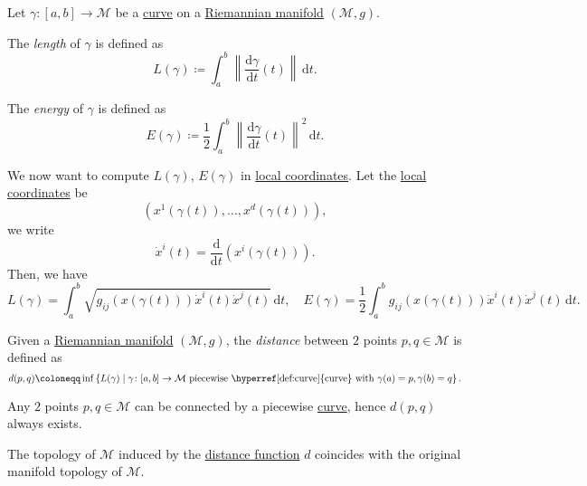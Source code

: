 \begin{definition*}
	Let \(\gamma \colon [a, b] \to  \mathcal{M} \) be a \hyperref[def:curve]{curve} on a \hyperref[def:Riemannian-manifold]{Riemannian manifold} \((\mathcal{M} , g)\).

	\begin{definition}[Length]\label{def:length}
		The \emph{length} of \(\gamma \) is defined as
		\[
			L(\gamma ) \coloneqq \int_{a}^{b} \left\lVert \frac{\mathrm{d}\gamma }{\mathrm{d}t} (t) \right\rVert  \,\mathrm{d}t .
		\]
	\end{definition}

	\begin{definition}[Energy]\label{def:energy}
		The \emph{energy} of \(\gamma \) is defined as
		\[
			E(\gamma )\coloneqq \frac{1}{2} \int_{a}^{b} \left\lVert \frac{\mathrm{d}\gamma }{\mathrm{d}t} (t) \right\rVert ^2 \,\mathrm{d}t .
		\]
	\end{definition}
\end{definition*}

We now want to compute \(L(\gamma )\), \(E(\gamma )\) in \hyperref[def:coordinate-chart]{local coordinates}. Let the \hyperref[def:coordinate-chart]{local coordinates} be
\[
	(x^1(\gamma (t)), \ldots , x^d(\gamma (t))),
\]
we write
\[
	\dot{x}^i (t) = \frac{\mathrm{d}}{\mathrm{d}t} (x^i (\gamma (t))).
\]
Then, we have
\[
	L(\gamma ) = \int_{a}^{b} \sqrt{g_{ij} (x(\gamma (t))) \dot{x}^i(t)\dot{x}^j(t)}  \,\mathrm{d}t, \quad
	E(\gamma ) = \frac{1}{2} \int_{a}^{b} g_{ij} (x(\gamma (t))) \dot{x}^i(t)\dot{x}^j(t) \,\mathrm{d}t.
\]

\begin{definition}[Distance]\label{def:distance}
	Given a \hyperref[def:Riemannian-manifold]{Riemannian manifold} \((\mathcal{M} , g)\), the \emph{distance} between \(2\) points \(p, q\in \mathcal{M} \) is defined as
	\[
		d(p, q)\coloneqq \inf \left\{ L(\gamma ) \mid \gamma \colon [a, b]\to  \mathcal{M} \text{ piecewise \hyperref[def:curve]{curve} with }\gamma (a)=p, \gamma (b)=q \right\} .
	\]
\end{definition}

\begin{note}
	Any \(2\) points \(p, q\in \mathcal{M} \) can be connected by a piecewise \hyperref[def:curve]{curve}, hence \(d(p, q)\) always exists.
\end{note}

\begin{corollary}
	The topology of \(\mathcal{M} \) induced by the \hyperref[def:distance]{distance function} \(d\) coincides with the original manifold topology of \(\mathcal{M} \).
\end{corollary}

